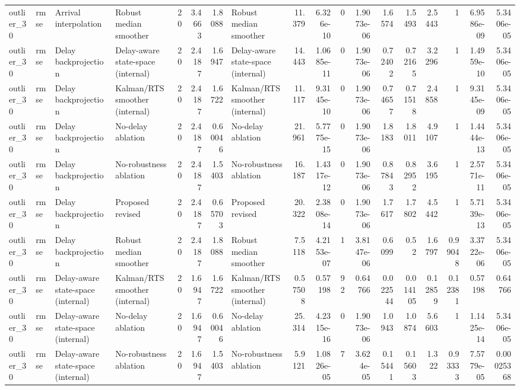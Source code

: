 \begin{table}[!htbp]
{\begin{tabular}{llllrrrlrrrrrrrrrr}
outlier_30 & rmse & Arrival interpolation & Robust median smoother & 20 & 3.4663 & 1.8088 & Robust median smoother & 11.379 & 6.326e-10 & 0 & 1.9073e-06 & 1.6574 & 1.5493 & 2.5443 & 1 & 6.9586e-09 & 5.3406e-05 \\
outlier_30 & rmse & Delay backprojection & Delay-aware state-space (internal) & 20 & 2.4187 & 1.6947 & Delay-aware state-space (internal) & 14.443 & 1.0685e-11 & 0 & 1.9073e-06 & 0.72402 & 0.72165 & 3.2296 & 1 & 1.4959e-10 & 5.3406e-05 \\
outlier_30 & rmse & Delay backprojection & Kalman/RTS smoother (internal) & 20 & 2.4187 & 1.6722 & Kalman/RTS smoother (internal) & 11.117 & 9.3145e-10 & 0 & 1.9073e-06 & 0.74657 & 0.71518 & 2.4858 & 1 & 9.3145e-09 & 5.3406e-05 \\
outlier_30 & rmse & Delay backprojection & No-delay ablation & 20 & 2.4187 & 0.60046 & No-delay ablation & 21.961 & 5.7775e-15 & 0 & 1.9073e-06 & 1.8183 & 1.8011 & 4.9107 & 1 & 1.4444e-13 & 5.3406e-05 \\
outlier_30 & rmse & Delay backprojection & No-robustness ablation & 20 & 2.4187 & 1.5403 & No-robustness ablation & 16.187 & 1.4317e-12 & 0 & 1.9073e-06 & 0.87843 & 0.82952 & 3.6195 & 1 & 2.5771e-11 & 5.3406e-05 \\
outlier_30 & rmse & Delay backprojection & Proposed revised & 20 & 2.4187 & 0.65703 & Proposed revised & 20.322 & 2.3808e-14 & 0 & 1.9073e-06 & 1.7617 & 1.7802 & 4.5442 & 1 & 5.7139e-13 & 5.3406e-05 \\
outlier_30 & rmse & Delay backprojection & Robust median smoother & 20 & 2.4187 & 1.8088 & Robust median smoother & 7.5118 & 4.2153e-07 & 1 & 3.8147e-06 & 0.6099 & 0.52 & 1.6797 & 0.99048 & 3.3722e-06 & 5.3406e-05 \\
outlier_30 & rmse & Delay-aware state-space (internal) & Kalman/RTS smoother (internal) & 20 & 1.6947 & 1.6722 & Kalman/RTS smoother (internal) & 0.57508 & 0.57198 & 92 & 0.64766 & 0.022544 & 0.014105 & 0.12859 & 0.12381 & 0.57198 & 0.64766 \\
outlier_30 & rmse & Delay-aware state-space (internal) & No-delay ablation & 20 & 1.6947 & 0.60046 & No-delay ablation & 25.314 & 4.2315e-16 & 0 & 1.9073e-06 & 1.0943 & 1.0874 & 5.6603 & 1 & 1.1425e-14 & 5.3406e-05 \\
outlier_30 & rmse & Delay-aware state-space (internal) & No-robustness ablation & 20 & 1.6947 & 1.5403 & No-robustness ablation & 5.9121 & 1.0826e-05 & 7 & 3.624e-05 & 0.15441 & 0.15603 & 1.322 & 0.93333 & 7.5779e-05 & 0.00025368 \\

\end{tabular}}
\end{table}
